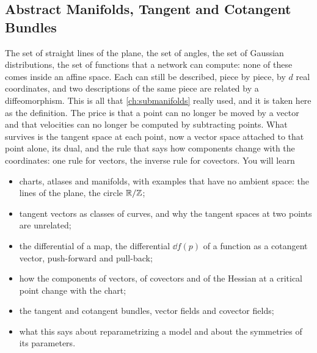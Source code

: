 \begin{notechapter}
\chapter{Abstract Manifolds, Tangent and Cotangent Bundles}
\label{ch:tangent-bundles}

\begin{chapterintro}
The set of straight lines of the plane, the set of angles, the set of
Gaussian distributions, the set of functions that a network can compute:
none of these comes inside an affine space. Each can still be described,
piece by piece, by $d$ real coordinates, and two descriptions of the same
piece are related by a diffeomorphism. This is all that
\cref{ch:submanifolds} really used, and it is taken here as the
definition. The price is that a point can no longer be moved by a vector
and that velocities can no longer be computed by subtracting points. What
survives is the tangent space at each point, now a vector space attached
to that point alone, its dual, and the rule that says how components
change with the coordinates: one rule for vectors, the inverse rule for
covectors. You will learn
\begin{itemize}[nosep]
  \item charts, atlases and manifolds, with examples that have no ambient
        space: the lines of the plane, the circle $\mathbb{R}/\mathbb{Z}$;
  \item tangent vectors as classes of curves, and why the tangent spaces
        at two points are unrelated;
  \item the differential of a map, the differential $\dd f(p)$ of a
        function as a cotangent vector, push-forward and pull-back;
  \item how the components of vectors, of covectors and of the Hessian at
        a critical point change with the chart;
  \item the tangent and cotangent bundles, vector fields and covector
        fields;
  \item what this says about reparametrizing a model and about the
        symmetries of its parameters.
\end{itemize}
\end{chapterintro}


\end{notechapter}

